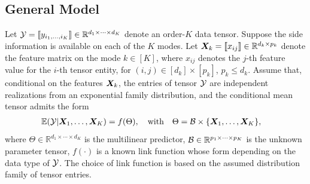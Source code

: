 \documentclass{article}
\theoremstyle{definition}
\theoremstyle{definition}
\begin{document}
\subsection{General Model}

Let $\mathcal{Y}=\llbracket y_{i_1,\ldots,i_K} \rrbracket\in\mathbb{R}^{d_1\times \cdots\times d_K}$ denote an order-$K$ data tensor. Suppose the side information is available on each of the $K$ modes. Let $\bm X_k=\llbracket x_{ij} \rrbracket\in\mathbb{R}^{d_k\times p_k}$ denote the feature matrix on the mode $k\in[K]$, where $x_{ij}$ denotes the $j$-th feature value for the $i$-th tensor entity, for $(i,j)\in[d_k]\times[p_k]$, $p_k\leq d_k$. Assume that, conditional on the features $\bm X_k$, the entries of tensor $\mathcal{Y}$ are independent realizations from an exponential family distribution, and the conditional mean tensor admits the form
\begin{align}\label{eq:tensormodel}
&\mathbb{E}(\mathcal{Y}|\bm X_1,\ldots,\bm X_K)=f(\Theta),\quad \text{with}\quad \Theta =\mathcal{B}\times\{\bm X_1,\ldots, \bm X_K\} ,
\end{align}
where $\Theta\in\mathbb{R}^{d_1\times \cdots\times d_K}$ is the multilinear predictor, $\mathcal{B}\in\mathbb{R}^{p_1\times \cdots \times p_K}$ is the unknown parameter tensor, $f(\cdot)$ is a known link function whose form depending on the data type of $\mathcal{Y}$. The choice of link function is based on the assumed distribution family of tensor entries. 
\end{document}
